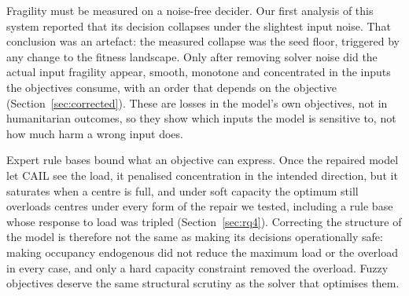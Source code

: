 \documentclass[systems,article,submit,moreauthors,pdftex]{Definitions/mdpi}
\begin{document}
Fragility must be measured on a noise-free decider. Our first analysis of this system reported
that its decision collapses under the slightest input noise. That conclusion was an artefact: the
measured collapse was the seed floor, triggered by any change to the fitness landscape. Only
after removing solver noise did the actual input fragility appear, smooth, monotone and
concentrated in the inputs the objectives consume, with an order that depends on the objective
(Section~\ref{sec:corrected}). These are losses in the model's own
objectives, not in humanitarian outcomes, so they show which inputs the model is sensitive to,
not how much harm a wrong input does.

Expert rule bases bound what an objective can express. Once the repaired model let CAIL see the
load, it penalised concentration in the intended direction, but it saturates when a centre is
full, and under soft capacity the optimum still overloads centres under every form of the repair
we tested, including a rule base whose response to load was tripled (Section~\ref{sec:rq4}).
Correcting the structure of the model is therefore not the same as making its decisions
operationally safe: making occupancy endogenous did not reduce the maximum load or the overload
in every case, and only a hard capacity constraint removed the overload. Fuzzy objectives deserve
the same structural scrutiny as the solver that optimises them.
\end{document}
